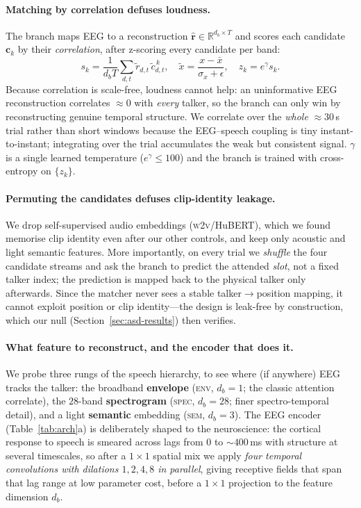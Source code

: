 \documentclass[10pt,twocolumn]{article}
\begin{document}
\paragraph{Matching by correlation defuses loudness.}
The branch maps EEG to a reconstruction $\hat{\mathbf r}\!\in\!\mathbb R^{d_b\times T}$
and scores each candidate $\mathbf c_k$ by their \emph{correlation}, after
z-scoring every candidate per band:
\begin{equation}
s_k=\frac{1}{d_b T}\sum_{d,t}\tilde r_{d,t}\,\tilde c^{\,k}_{d,t},\quad
\tilde x=\frac{x-\bar x}{\sigma_x+\epsilon},\quad z_k=e^{\gamma}s_k .
\label{eq:corr}
\end{equation}
Because correlation is scale-free, loudness cannot help: an uninformative EEG
reconstruction correlates $\approx\!0$ with \emph{every} talker, so the branch
can only win by reconstructing genuine temporal structure. We correlate over the
\emph{whole} $\approx\!30$\,s trial rather than short windows because the
EEG--speech coupling is tiny instant-to-instant; integrating over the trial
accumulates the weak but consistent signal. $\gamma$ is a single learned
temperature ($e^{\gamma}\!\le\!100$) and the branch is trained with cross-entropy
on $\{z_k\}$.

\paragraph{Permuting the candidates defuses clip-identity leakage.}
We drop self-supervised audio embeddings (\textsc{w2v}/HuBERT), which we found
memorise clip identity even after our other controls, and keep only acoustic and
light semantic features. More importantly, on every trial we \emph{shuffle} the
four candidate streams and ask the branch to predict the attended \emph{slot},
not a fixed talker index; the prediction is mapped back to the physical talker
only afterwards. Since the matcher never sees a stable talker$\rightarrow$position
mapping, it cannot exploit position or clip identity---the design is leak-free by
construction, which our null (Section~\ref{sec:asd-results}) then verifies.

\paragraph{What feature to reconstruct, and the encoder that does it.}
We probe three rungs of the speech hierarchy, to see where (if anywhere) EEG
tracks the talker: the broadband \textbf{envelope} (\textsc{env}, $d_b\!=\!1$;
the classic attention correlate), the $28$-band \textbf{spectrogram}
(\textsc{spec}, $d_b\!=\!28$; finer spectro-temporal detail), and a light
\textbf{semantic} embedding (\textsc{sem}, $d_b\!=\!3$). The EEG encoder
(Table~\ref{tab:arch}a) is deliberately shaped to the neuroscience: the cortical
response to speech is smeared across lags from $0$ to $\sim\!400$\,ms with
structure at several timescales, so after a $1{\times}1$ spatial mix we apply
\emph{four temporal convolutions with dilations $1,2,4,8$ in parallel}, giving
receptive fields that span that lag range at low parameter cost, before a
$1{\times}1$ projection to the feature dimension $d_b$.
\end{document}
